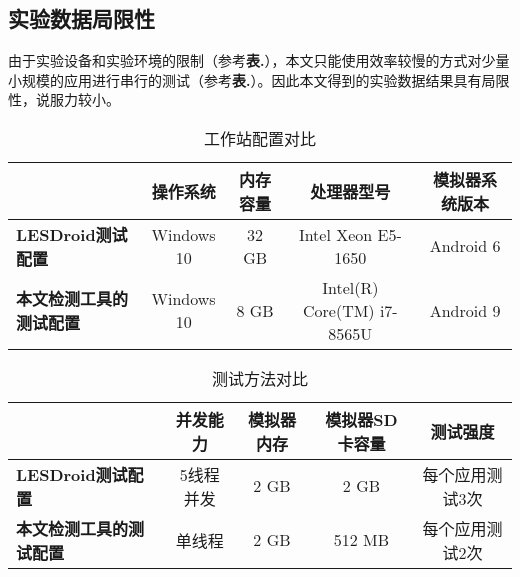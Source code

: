 \subsection{实验数据局限性}

由于实验设备和实验环境的限制（参考\textbf{表.}\redbf{\ref{table:pc-compare}}），本文只能使用效率较慢的方式对少量小规模的应用进行串行的测试（参考\textbf{表.}\redbf{\ref{table:method-compare}}）。因此本文得到的实验数据结果具有局限性，说服力较小。

\begin{table}[htb]\footnotesize
	\centering
	\caption{工作站配置对比}
	\vspace{2mm}
	\begin{tabular}{lcccc}
		\toprule
		&\textbf{操作系统}&\textbf{内存容量}&\textbf{处理器型号}&\textbf{模拟器系统版本}\\
		\midrule
		\textbf{LESDroid测试配置\cite{jun2018lesdroid}}&Windows 10&32 GB&Intel Xeon E5-1650&Android 6\\
		\hline
		\textbf{本文检测工具的测试配置}&Windows 10&8 GB&Intel(R) Core(TM) i7-8565U&Android 9\\
		\bottomrule
	\end{tabular}
	\label{table:pc-compare}
\end{table}

\begin{table}[htb]\footnotesize
	\centering
	\caption{测试方法对比}
	\vspace{2mm}
	\begin{tabular}{lcccc}
		\toprule
		&\textbf{并发能力}&\textbf{模拟器内存}&\textbf{模拟器SD卡容量}&\textbf{测试强度}\\
		\midrule
		\textbf{LESDroid测试配置\cite{jun2018lesdroid}}&5线程并发&2 GB&2 GB&每个应用测试3次\\
		\hline
		\textbf{本文检测工具的测试配置}&单线程&2 GB&512 MB&每个应用测试2次\\
		\bottomrule
	\end{tabular}
	\label{table:method-compare}
\end{table}
